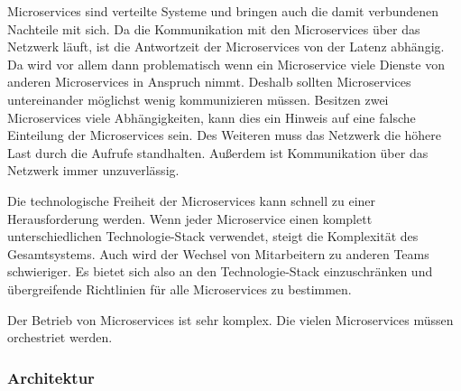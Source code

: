 Microservices sind verteilte Systeme und bringen auch die damit verbundenen Nachteile mit sich. Da die Kommunikation mit den Microservices über das Netzwerk läuft, ist die Antwortzeit der Microservices von der Latenz abhängig. Da wird vor allem dann problematisch wenn ein Microservice viele Dienste von anderen Microservices in Anspruch nimmt. Deshalb sollten Microservices untereinander möglichst wenig kommunizieren müssen. Besitzen zwei Microservices viele Abhängigkeiten, kann dies ein Hinweis auf eine falsche Einteilung der Microservices sein. Des Weiteren muss das Netzwerk die höhere Last durch die Aufrufe standhalten. Außerdem ist Kommunikation über das Netzwerk immer unzuverlässig.

Die technologische Freiheit der Microservices kann schnell zu einer Herausforderung werden. Wenn jeder Microservice einen komplett unterschiedlichen Technologie-Stack verwendet, steigt die Komplexität des Gesamtsystems. Auch wird der Wechsel von Mitarbeitern zu anderen Teams schwieriger. Es bietet sich also an den Technologie-Stack einzuschränken und übergreifende Richtlinien für alle Microservices zu bestimmen.

Der Betrieb von Microservices ist sehr komplex. Die vielen Microservices müssen orchestriet werden.

\subsubsection{Architektur}

